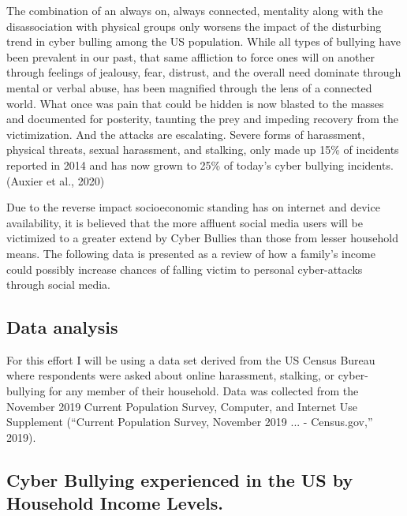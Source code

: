 \documentclass[
  man,LLO-8200, Introduction to Data Science]{apa6}
\begin{document}
The combination of an always on, always connected, mentality along with the disassociation with physical groups only worsens the impact of the disturbing trend in cyber bulling among the US population. While all types of bullying have been prevalent in our past, that same affliction to force ones will on another through feelings of jealousy, fear, distrust, and the overall need dominate through mental or verbal abuse, has been magnified through the lens of a connected world. What once was pain that could be hidden is now blasted to the masses and documented for posterity, taunting the prey and impeding recovery from the victimization. And the attacks are escalating. Severe forms of harassment, physical threats, sexual harassment, and stalking, only made up 15\% of incidents reported in 2014 and has now grown to 25\% of today's cyber bullying incidents. (Auxier et al., 2020)

Due to the reverse impact socioeconomic standing has on internet and device availability, it is believed that the more affluent social media users will be victimized to a greater extend by Cyber Bullies than those from lesser household means. The following data is presented as a review of how a family's income could possibly increase chances of falling victim to personal cyber-attacks through social media.

\hypertarget{data-analysis}{%
\subsection{Data analysis}\label{data-analysis}}

For this effort I will be using a data set derived from the US Census Bureau where respondents were asked about online harassment, stalking, or cyber-bullying for any member of their household. Data was collected from the November 2019 Current Population Survey, Computer, and Internet Use Supplement ({``Current Population Survey, November 2019 ... - Census.gov,''} 2019).

\hypertarget{cyber-bullying-experienced-in-the-us-by-household-income-levels.}{%
\subsection{Cyber Bullying experienced in the US by Household Income Levels.}\label{cyber-bullying-experienced-in-the-us-by-household-income-levels.}}
\end{document}
